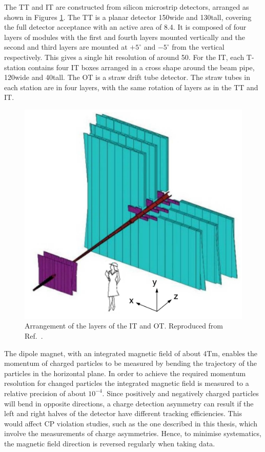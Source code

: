 The TT and IT are constructed from silicon microstrip detectors, arranged as shown in Figures \ref{itandot}. The TT is a planar detector 150\cm wide and 130\cm tall, covering the full detector acceptance with an active area of 8.4\ma. It is composed of four layers of modules with the first and fourth layers mounted vertically and the second and third layers are mounted at $+5^{\circ}$ and $-5^{\circ}$ from the vertical respectively. This gives a single hit resolution of around 50\mum. For the IT, each T-station contains four IT boxes arranged in a cross shape around the beam pipe, 120\cm wide and 40\cm tall. The OT is a straw drift tube detector. The straw tubes in each station are in four layers, with the same rotation of layers as in the TT and IT.

\begin{figure}
\centering
\includegraphics[width=0.5\linewidth]{figures/detector/InnerAndOuterTracker.pdf}
\caption{Arrangement of the layers of the IT and OT. Reproduced from Ref.~\cite{lhcbdetector2008}.}
\label{itandot}
\end{figure}

The dipole magnet, with an integrated magnetic field of about 4Tm, enables the momentum of charged particles to be measured by bending the trajectory of the particles in the horizontal plane. In order to achieve the required momentum resolution for changed particles the integrated magnetic field is measured to a relative precision of about $10^{-4}$. Since positively and negatively charged particles will bend in opposite directions, a charge detection asymmetry can result if the left and right halves of the detector have different tracking efficiencies. This would affect CP violation studies, such as the one described in this thesis, which involve the measurements of charge asymmetries. Hence, to minimise systematics, the magnetic field direction is reversed regularly when taking data.

